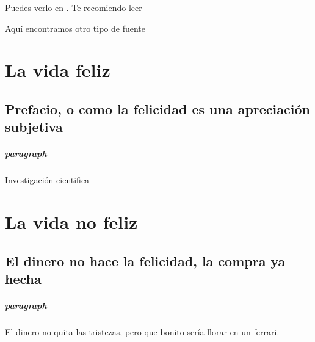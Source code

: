 \documentclass[a4paper,openright,12pt]{report}
\begin{document}
	
	Puedes verlo en \cite{Patricio2011}. Te recomiendo leer \cite{Patricio2011 ,Zacarias2009, latexcompanion}
	
	Aquí encontramos otro tipo de fuente \cite{knuthwebsite}
	
	\chapter{La vida feliz}
	\section[Prefacio]{Prefacio, o como 
		la felicidad es una apreciación subjetiva}
	\paragraph{paragraph} Investigación cientifica
	
	\chapter{La vida no feliz}
	\section[Prefacio]{El dinero no hace la felicidad, la compra ya hecha}
	\paragraph{paragraph} El dinero no quita las tristezas, pero que bonito sería llorar en un ferrari.
	
	
	
\end{document}
